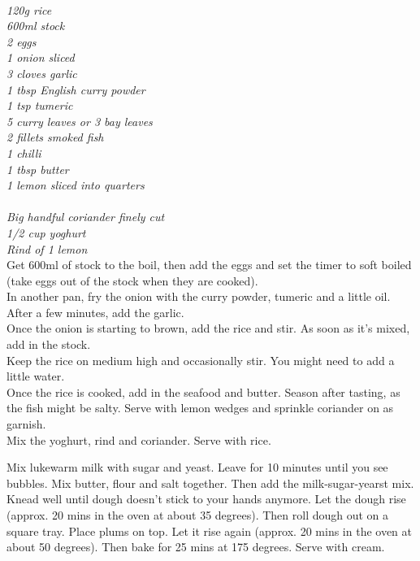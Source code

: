 \documentclass{tufte-book}
\begin{document}
\smallskip
{}
\\\emph{120g rice
\\600ml stock
\\2 eggs
\\1 onion sliced
\\3 cloves garlic
\\1 tbsp English curry powder
\\1 tsp tumeric
\\5 curry leaves or 3 bay leaves
\\2 fillets smoked fish
\\1 chilli
\\1 tbsp butter
\\1 lemon sliced into quarters
}
\\
\\\emph{Big handful coriander finely cut
\\1/2 cup yoghurt
\\Rind of 1 lemon
}
\smallskip
\\Get 600ml of stock to the boil, then add the eggs and set the timer to soft boiled (take eggs out of the stock when they are cooked).
\\In another pan, fry the onion with the curry powder, tumeric and a little oil. After a few minutes, add the garlic.
\\Once the onion is starting to brown, add the rice and stir. As soon as it's mixed, add in the stock. 
\\Keep the rice on medium high and occasionally stir. You might need to add a little water.
\\Once the rice is cooked, add in the seafood and butter. Season after tasting, as the fish might be salty. Serve with lemon wedges and sprinkle coriander on as garnish.
\\Mix the yoghurt, rind and coriander. Serve with rice.

Mix lukewarm milk with sugar and yeast. Leave for 10 minutes until you see bubbles. 
Mix butter, flour and salt together. Then add the milk-sugar-yearst mix.
Knead well until dough doesn't stick to your hands anymore.
Let the dough rise (approx. 20 mins in the oven at about 35 degrees).
Then roll dough out on a square tray. Place plums on top. 
Let it rise again (approx. 20 mins in the oven at about 50 degrees).
Then bake for 25 mins at 175 degrees. 
Serve with cream.

\end{document}
